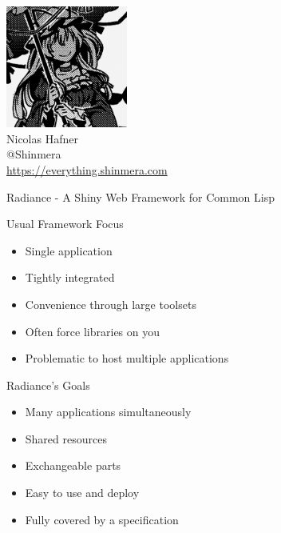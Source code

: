 \documentclass[12pt]{beamer}
\newcommand{\toptitle}[1]{
  {\huge #1} \\
  \vspace{0.2cm}
}
\begin{document}
\begin{frame}
  \begin{center}
    \includegraphics[height=4cm]{avatar.png}\\
    \vspace{0.2cm}
    {\Large Nicolas Hafner} \\
    \vspace{0.2cm}
    {\Huge @Shinmera} \\
    \vspace{0.2cm}
    \url{https://everything.shinmera.com}
  \end{center}
\end{frame}

\begin{frame}
  \toptitle{Radiance - A Shiny Web Framework for Common Lisp}
\end{frame}

\begin{frame}
  \toptitle{Usual Framework Focus}
  \begin{itemize}
    \item Single application
    \item Tightly integrated
    \item Convenience through large toolsets
      \pause
    \item Often force libraries on you
      \pause
    \item Problematic to host multiple applications
  \end{itemize}
\end{frame}

\begin{frame}
  \toptitle{Radiance's Goals}
  \begin{itemize}
    \item Many applications simultaneously
    \item Shared resources
    \item Exchangeable parts
    \item Easy to use and deploy
      \pause
    \item Fully covered by a specification
  \end{itemize}
\end{frame}
\end{document}
